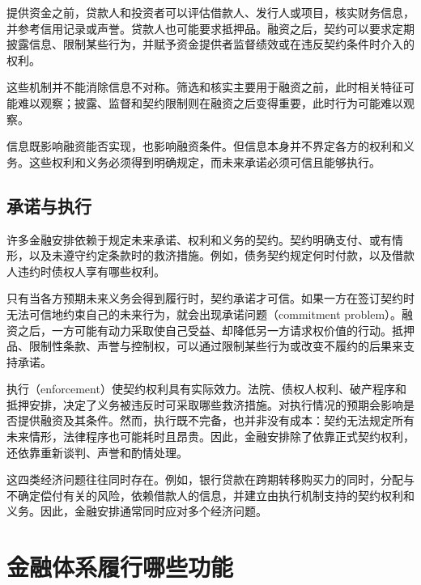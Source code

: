 \begin{tcolorbox}[
  enhanced,
  breakable,
  colback=white,
  colframe=FinanceBlue,
  boxrule=0.7pt,
  sharp corners,
  borderline west={2.2pt}{0pt}{FinanceBlue},
  title=\textbf{金融视角：金融契约为何不只是转移资金},
  coltitle=white,
  colbacktitle=FinanceBlue,
  fonttitle=\bfseries,
  before skip=1.2em,
  after skip=1.2em
]
提供资金之前，贷款人和投资者可以评估借款人、发行人或项目，核实财务信息，并参考信用记录或声誉。贷款人也可能要求抵押品。融资之后，契约可以要求定期披露信息、限制某些行为，并赋予资金提供者监督绩效或在违反契约条件时介入的权利。

这些机制并不能消除信息不对称。筛选和核实主要用于融资之前，此时相关特征可能难以观察；披露、监督和契约限制则在融资之后变得重要，此时行为可能难以观察。
\end{tcolorbox}

信息既影响融资能否实现，也影响融资条件。但信息本身并不界定各方的权利和义务。这些权利和义务必须得到明确规定，而未来承诺必须可信且能够执行。


\subsection{承诺与执行}

许多金融安排依赖于规定未来承诺、权利和义务的契约。契约明确支付、或有情形，以及未遵守约定条款时的救济措施。例如，债务契约规定何时付款，以及借款人违约时债权人享有哪些权利。

只有当各方预期未来义务会得到履行时，契约承诺才可信。如果一方在签订契约时无法可信地约束自己的未来行为，就会出现承诺问题（commitment problem）。融资之后，一方可能有动力采取使自己受益、却降低另一方请求权价值的行动。抵押品、限制性条款、声誉与控制权，可以通过限制某些行为或改变不履约的后果来支持承诺。

执行（enforcement）使契约权利具有实际效力。法院、债权人权利、破产程序和抵押安排，决定了义务被违反时可采取哪些救济措施。对执行情况的预期会影响是否提供融资及其条件。然而，执行既不完备，也并非没有成本：契约无法规定所有未来情形，法律程序也可能耗时且昂贵。因此，金融安排除了依靠正式契约权利，还依靠重新谈判、声誉和酌情处理。

这四类经济问题往往同时存在。例如，银行贷款在跨期转移购买力的同时，分配与不确定偿付有关的风险，依赖借款人的信息，并建立由执行机制支持的契约权利和义务。因此，金融安排通常同时应对多个经济问题。

\section{金融体系履行哪些功能}

